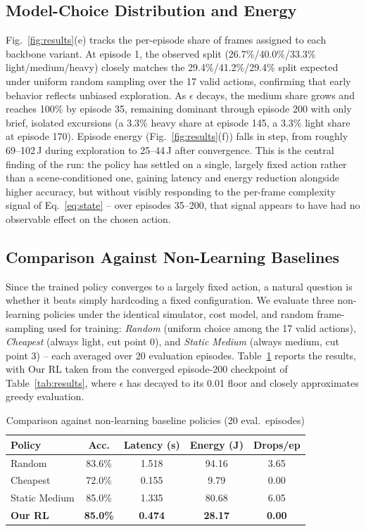 \documentclass[conference]{IEEEtran}
\begin{document}
\subsection{Model-Choice Distribution and Energy}
Fig.~\ref{fig:results}(e) tracks the per-episode share of frames assigned to each backbone variant. At episode 1, the observed split (26.7\%/40.0\%/33.3\% light/medium/heavy) closely matches the 29.4\%/41.2\%/29.4\% split expected under uniform random sampling over the 17 valid actions, confirming that early behavior reflects unbiased exploration. As $\epsilon$ decays, the medium share grows and reaches 100\% by episode 35, remaining dominant through episode 200 with only brief, isolated excursions (a 3.3\% heavy share at episode 145, a 3.3\% light share at episode 170). Episode energy (Fig.~\ref{fig:results}(f)) falls in step, from roughly 69--102\,J during exploration to 25--44\,J after convergence. This is the central finding of the run: the policy has settled on a single, largely fixed action rather than a scene-conditioned one, gaining latency and energy reduction alongside higher accuracy, but without visibly responding to the per-frame complexity signal of Eq.~\ref{eq:state} -- over episodes 35--200, that signal appears to have had no observable effect on the chosen action.

\subsection{Comparison Against Non-Learning Baselines}
Since the trained policy converges to a largely fixed action, a natural question is whether it beats simply hardcoding a fixed configuration. We evaluate three non-learning policies under the identical simulator, cost model, and random frame-sampling used for training: \textit{Random} (uniform choice among the 17 valid actions), \textit{Cheapest} (always light, cut point 0), and \textit{Static Medium} (always medium, cut point 3) -- each averaged over 20 evaluation episodes. Table~\ref{tab:baselines} reports the results, with Our RL taken from the converged episode-200 checkpoint of Table~\ref{tab:results}, where $\epsilon$ has decayed to its 0.01 floor and closely approximates greedy evaluation.

\begin{table}[t]
\centering
\caption{Comparison against non-learning baseline policies (20 eval.\ episodes)}
\label{tab:baselines}
\begin{tabular}{lcccc}
\toprule
\textbf{Policy} & \textbf{Acc.} & \textbf{Latency (s)} & \textbf{Energy (J)} & \textbf{Drops/ep} \\
\midrule
Random & 83.6\% & 1.518 & 94.16 & 3.65 \\
Cheapest & 72.0\% & 0.155 & 9.79 & 0.00 \\
Static Medium & 85.0\% & 1.335 & 80.68 & 6.05 \\
\textbf{Our RL} & \textbf{85.0\%} & \textbf{0.474} & \textbf{28.17} & \textbf{0.00} \\
\bottomrule
\end{tabular}
\end{table}
\end{document}
